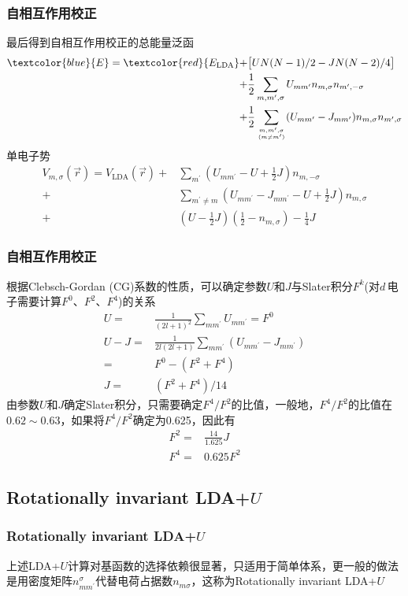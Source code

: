 {\frame
{
	\frametitle{自相互作用校正}
	最后得到自相互作用校正的总能量泛函
	\begin{displaymath}
		\begin{aligned}
			\textcolor{blue}{E}=\textcolor{red}{E_{\mathrm{LDA}}}+&\big[UN(N-1)/2-JN(N-2)/4\big]\\
			+&\frac12\sum_{m,m^{\prime},\sigma}U_{mm^{\prime}}n_{m,\sigma}n_{m^{\prime},-\sigma}\\
			+&\frac12\sum_{m,m^{\prime},\sigma\atop(m\neq m^{\prime})}(U_{mm^{\prime}}-J_{mm^{\prime}})n_{m,\sigma}n_{m^{\prime},\sigma}
		\end{aligned}
	\end{displaymath}
	单电子势
	\begin{displaymath}
		\begin{aligned}
			V_{m,\sigma}(\vec r)=V_{\mathrm{LDA}}(\vec r)+&\sum_{m^{\prime}}(U_{mm^{\prime}}-U+\frac12J)n_{m,-\sigma}\\
			+&\sum_{m^{\prime}\neq m}(U_{mm^{\prime}}-J_{mm^{\prime}}-U+\frac12J)n_{m,\sigma}\\
			+&(U-\frac12J)(\frac12-n_{m,\sigma})-\frac14J
		\end{aligned}
	\end{displaymath}
}

\frame
{
	\frametitle{自相互作用校正}
	根据\textrm{Clebsch-Gordan (CG)}系数的性质，可以确定参数$U$和$J$与\textrm{Slater}积分$F^k$(对$d$\,电子需要计算$F^0$、$F^2$、$F^4$)的关系
	\begin{displaymath}
		\begin{aligned}
			U=&\frac1{(2l+1)^2}\sum_{mm^{\prime}}U_{mm^{\prime}}=F^0\\
			U-J=&\frac1{2l(2l+1)}\sum_{mm^{\prime}}(U_{mm^{\prime}}-J_{mm^{\prime}})\\
			=&F^0-(F^2+F^4)	\\
			J=&(F^2+F^4)/14
		\end{aligned}
	\end{displaymath}
	由参数$U$和$J$确定\textrm{Slater}积分，只需要确定$F^4/F^2$的比值，一般地，$F^4/F^2$的比值在$0.62\sim0.63$，如果将$F^4/F^2$确定为0.625，因此有
	\begin{displaymath}
		\begin{aligned}
			F^2=&\frac{14}{1.625}J\\
			F^4=&0.625F^2
		\end{aligned}
	\end{displaymath}
}

\subsection{\rm{Rotationally invariant LDA+}$U$}
\frame
{
	\frametitle{\textrm{Rotationally invariant LDA+}$U$}
	上述\textrm{LDA}+$U$计算对基函数的选择依赖很显著，只适用于简单体系，更一般的做法是用密度矩阵$n_{mm^{\prime}}^{\sigma}$代替电荷占据数$n_{m\sigma}$，这称为\textrm{Rotationally invariant LDA}+$U$

}}
